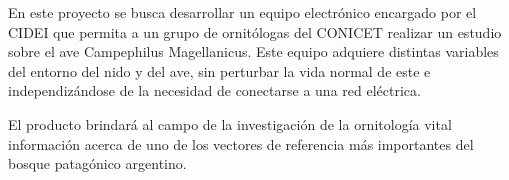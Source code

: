 En este proyecto se busca desarrollar un equipo electrónico encargado por el CIDEI que permita a un grupo de ornitólogas del CONICET realizar un estudio sobre el ave Campephilus Magellanicus. Este equipo adquiere distintas variables del entorno del nido y del ave, sin perturbar la vida normal de este e independizándose de la necesidad de conectarse a una red eléctrica. 

El producto brindará al campo de la investigación de la ornitología vital información acerca de uno de los vectores de referencia más importantes del bosque patagónico argentino.

